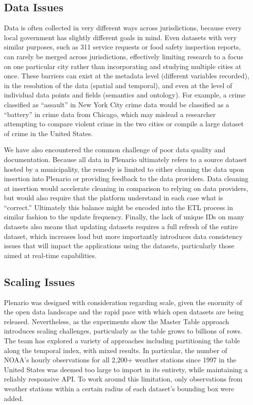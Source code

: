 \documentclass[11pt]{article}
\begin{document}
\subsection{\textbf{Data Issues}}
Data is often collected in very different ways across jurisdictions, because every local government has slightly different goals in mind. Even datasets with very similar purposes, such as 311 service requests or food safety inspection reports, can rarely be merged across jurisdictions, effectively limiting research to a focus on one particular city rather than incorporating and studying multiple cities at once. These barriers can exist at the metadata level (different variables recorded), in the resolution of the data (spatial and temporal), and even at the level of individual data points and fields (semantics and ontology). For example, a crime classified as ``assault'' in New York City crime data would be classified as a ``battery'' in crime data from Chicago, which may mislead a researcher attempting to compare violent crime in the two cities or compile a large dataset of crime in the United States. 

We have also encountered the common challenge of poor data quality and documentation. Because all data in Plenario ultimately refers to a source dataset hosted by a municipality, the remedy is limited to either cleaning the data upon insertion into Plenario or providing feedback to the data providers. Data cleaning at insertion would accelerate cleaning in comparison to relying on data providers, but would also require that the platform understand in each case what is ``correct.'' Ultimately this balance might be encoded into the ETL process in similar fashion to the update frequency. Finally, the lack of unique IDs on many datasets also means that updating datasets requires a full refresh of the entire dataset, which increases load but more importantly introduces data consistency issues that will impact the applications using the datasets, particularly those aimed at real-time capabilities. 

\subsection{\textbf{Scaling Issues}}
Plenario was designed with consideration regarding scale, given the enormity of the open data landscape and the rapid pace with which open datasets are being released. Nevertheless, as the experiments show the Master Table approach introduces scaling challenges, particularly as the table grows to billions of rows. The team has explored a variety of approaches including partitioning the table along the temporal index, with mixed results. In particular, the number of NOAA's hourly observations for all 2,200+ weather stations since 1997 in the United States was deemed too large to import in its entirety, while maintaining a reliably responsive API. To work around this limitation, only observations from weather stations within a certain radius of each dataset's bounding box were added.
\end{document}
